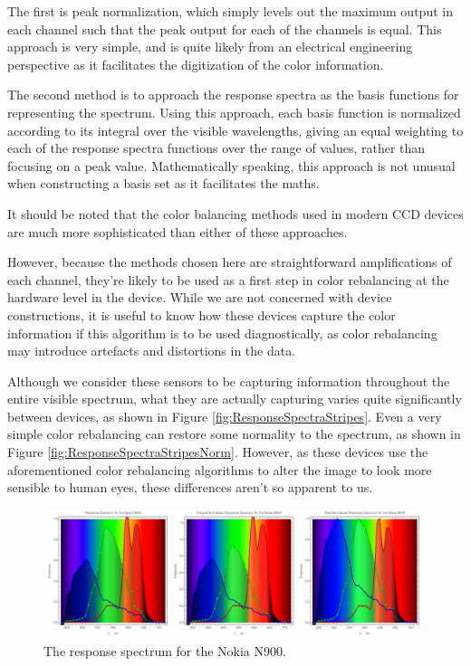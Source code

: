 The first is peak normalization, which simply levels out the maximum output in each channel such that the peak output for each of the channels is equal. This approach is very simple, and is quite likely from an electrical engineering perspective as it facilitates the digitization of the color information.

The second method is to approach the response spectra as the basis functions for representing the spectrum. Using this approach, each basis function is normalized according to its integral over the visible wavelengths, giving an equal weighting to each of the response spectra functions over the range of values, rather than focusing on a peak value. Mathematically speaking, this approach is not unusual when constructing a basis set as it facilitates the maths.





It should be noted that the color balancing methods used in modern CCD devices are much more sophisticated than either of these approaches.

However, because the methods chosen here are straightforward amplifications of each channel, they're likely to be used as a first step in color rebalancing at the hardware level in the device. While we are not concerned with device constructions, it is useful to know how these devices capture the color information if this algorithm is to be used diagnostically, as color rebalancing may introduce artefacts and distortions in the data.

Although we consider these sensors to be capturing information throughout the entire visible spectrum, what they are actually capturing varies quite significantly between devices, as shown in Figure \ref{fig:ResponseSpectraStripes}. Even a very simple color rebalancing can restore some normality to the spectrum, as shown in Figure \ref{fig:ResponseSpectraStripesNorm}. However, as these devices use the aforementioned color rebalancing algorithms to alter the image to look more sensible to human eyes, these differences aren't so apparent to us.

\clearpage

\begin{figure}[h!]
  \centering
    \includegraphics[width=0.99\textwidth]{Chapter1/Figs/ResponseSpectrum_NokiaN900.jpg}
    \caption{The response spectrum for the Nokia N900. }  \label{fig:ResponseSpectumNokia}
\end{figure}

